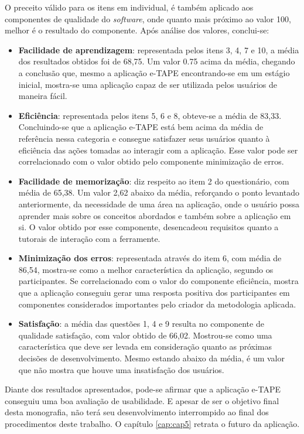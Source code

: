 O preceito válido para os itens em individual, é também aplicado aos componentes de qualidade do \textit{software}, onde quanto mais próximo ao valor 100, 
melhor é o resultado do componente.
Após análise dos valores, conclui-se:
\begin{itemize}
    \item \textbf{Facilidade de aprendizagem}: representada pelos itens 3, 4, 7 e 10, a média dos resultados obtidos foi de 68,75. Um valor 0.75 acima da média, 
          chegando a conclusão que, mesmo a aplicação e-TAPE encontrando-se em um estágio inicial, mostra-se uma aplicação capaz de ser utilizada pelos usuários de maneira fácil.

    \item \textbf{Eficiência}: representada pelos itens 5, 6 e 8, obteve-se a média de 83,33. Concluindo-se que a aplicação e-TAPE está bem acima da média de referência
          nessa categoria e consegue satisfazer seus usuários quanto à eficiência das ações tomadas ao interagir com a aplicação. Esse valor pode ser correlacionado com o valor
          obtido pelo componente minimização de erros.

    \item \textbf{Facilidade de memorização}: diz respeito ao item 2 do questionário, com média de 65,38. Um valor 2,62 abaixo da média, 
          reforçando o ponto levantado anteriormente, da necessidade de uma área na aplicação, onde o usuário possa aprender mais sobre os conceitos abordados e também sobre 
          a aplicação em si. O valor obtido por esse componente, desencadeou requisitos quanto a tutorais de interação com a ferramente.

    \item \textbf{Minimização dos erros}: representada através do item 6, com média de 86,54, mostra-se como a melhor característica da aplicação, segundo os participantes. 
          Se correlacionado com o valor do componente eficiência, mostra que a aplicação conseguiu gerar uma resposta positiva dos participantes em componentes considerados importantes
          pelo criador da metodologia aplicada.

    \item \textbf{Satisfação}: a média das questões 1, 4 e 9 resulta no componente de qualidade satisfação, com valor obtido de 66,02. 
          Mostrou-se como uma característica que deve ser levada em consideração quanto as próximas decisões de desenvolvimento. Mesmo estando abaixo da média, é um valor que não
          mostra que houve uma insatisfação dos usuários. 

\end{itemize}

\par
Diante dos resultados apresentados, pode-se afirmar que a aplicação e-TAPE conseguiu uma boa avaliação de usabilidade. E apesar de ser o objetivo final desta monografia, 
não terá seu desenvolvimento interrompido ao final dos procedimentos deste trabalho. O capítulo \ref{cap:cap5} retrata o futuro da aplicação.  
